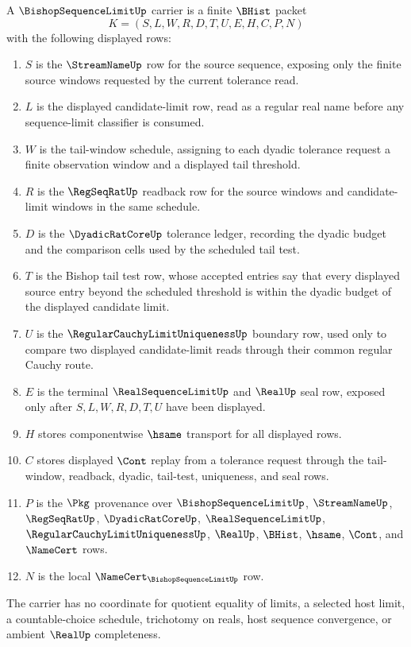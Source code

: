 \begin{definition}
\label{def:bishop-sequence-limit-carrier}
A $\BishopSequenceLimitUp$ carrier is a finite $\BHist$ packet
$$
K=(S,L,W,R,D,T,U,E,H,C,P,N)
$$
with the following displayed rows:
\begin{enumerate}
\item $S$ is the $\StreamNameUp$ row for the source sequence, exposing only the finite source windows requested by the current tolerance read.
\item $L$ is the displayed candidate-limit row, read as a regular real name before any sequence-limit classifier is consumed.
\item $W$ is the tail-window schedule, assigning to each dyadic tolerance request a finite observation window and a displayed tail threshold.
\item $R$ is the $\RegSeqRatUp$ readback row for the source windows and candidate-limit windows in the same schedule.
\item $D$ is the $\DyadicRatCoreUp$ tolerance ledger, recording the dyadic budget and the comparison cells used by the scheduled tail test.
\item $T$ is the Bishop tail test row, whose accepted entries say that every displayed source entry beyond the scheduled threshold is within the dyadic budget of the displayed candidate limit.
\item $U$ is the $\RegularCauchyLimitUniquenessUp$ boundary row, used only to compare two displayed candidate-limit reads through their common regular Cauchy route.
\item $E$ is the terminal $\RealSequenceLimitUp$ and $\RealUp$ seal row, exposed only after $S,L,W,R,D,T,U$ have been displayed.
\item $H$ stores componentwise $\hsame$ transport for all displayed rows.
\item $C$ stores displayed $\Cont$ replay from a tolerance request through the tail-window, readback, dyadic, tail-test, uniqueness, and seal rows.
\item $P$ is the $\Pkg$ provenance over $\BishopSequenceLimitUp$, $\StreamNameUp$, $\RegSeqRatUp$, $\DyadicRatCoreUp$, $\RealSequenceLimitUp$, $\RegularCauchyLimitUniquenessUp$, $\RealUp$, $\BHist$, $\hsame$, $\Cont$, and $\NameCert$ rows.
\item $N$ is the local $\NameCert_{\BishopSequenceLimitUp}$ row.
\end{enumerate}
The carrier has no coordinate for quotient equality of limits, a selected host limit, a countable-choice schedule, trichotomy on reals, host sequence convergence, or ambient $\RealUp$ completeness.
\end{definition}

